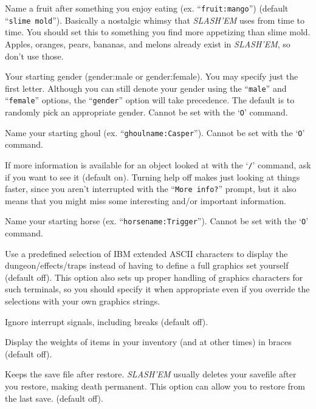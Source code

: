 \item[\ib{fruit}]
Name a fruit after something you enjoy eating (ex. ``{\tt fruit:mango}'')
(default ``{\tt slime mold}'').  Basically a nostalgic whimsy that {\it SLASH'EM\/} uses
from time to time.  You should set this to something you find more
appetizing than slime mold.  Apples, oranges, pears, bananas, and melons
already exist in {\it SLASH'EM}, so don't use those.

\item[\ib{gender}]
Your starting gender (gender:male or gender:female).
You may specify just the first letter.  Although you can
still denote your gender using the ``{\tt male}'' and ``{\tt female}''
options, the ``{\tt gender}'' option will take precedence.
The default is to randomly pick an appropriate gender.
Cannot be set with the `{\tt O}' command.

\item[\ib{ghoulname}]
Name your starting ghoul (ex. ``{\tt ghoulname:Casper}'').
Cannot be set with the `{\tt O}' command.

\item[\ib{help}]
If more information is available for an object looked at
with the `{\tt /}' command, ask if you want to see it (default on). Turning help
off makes just looking at things faster, since you aren't interrupted with the
``{\tt More info?}'' prompt, but it also means that you might miss some
interesting and/or important information.

\item[\ib{horsename}]
Name your starting horse (ex. ``{\tt horsename:Trigger}'').
Cannot be set with the `{\tt O}' command.

\item[\ib{IBMgraphics}]
Use a predefined selection of IBM extended ASCII characters to display the
dungeon/effects/traps instead of having to define a full graphics set
yourself (default off).
This option also sets up proper handling of graphics
characters for such terminals, so you should specify it when appropriate
even if you override the selections with your own graphics strings.

\item[\ib{ignintr}]
Ignore interrupt signals, including breaks (default off).

\item[\ib{invweight}]
Display the weights of items in your inventory (and at other times)
in braces (default off).

\item[\ib{keep\_savefile}]
Keeps the save file after restore.  {\it SLASH'EM\/} usually deletes your savefile
after you restore,  making death permanent.  This option can allow you to
restore from the last save. (default off).

